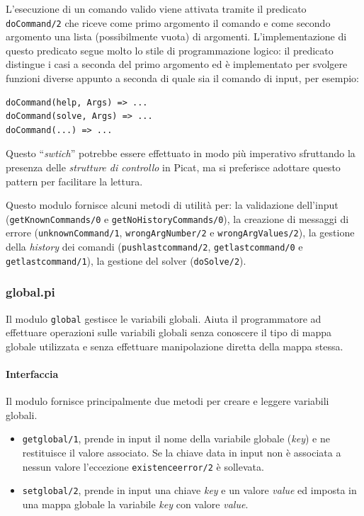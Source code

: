 \documentclass[12pt,a4paper,openright]{book} %
\begin{document}
L'esecuzione di un comando valido viene attivata tramite il predicato
\texttt{doCommand/2} che riceve come primo argomento il comando e come
secondo argomento una lista (possibilmente vuota) di
argomenti. L'implementazione di questo predicato segue molto lo stile
di programmazione logico: il predicato distingue i casi a seconda del
primo argomento ed è implementato per svolgere funzioni diverse
appunto a seconda di quale sia il comando di input, per esempio:
\begin{verbatim}
doCommand(help, Args) => ...
doCommand(solve, Args) => ...
doCommand(...) => ...
\end{verbatim}
Questo ``\textit{swtich}'' potrebbe essere effettuato in modo più
imperativo sfruttando la presenza delle \textit{strutture di
  controllo} in Picat, ma si preferisce adottare questo pattern per
facilitare la lettura.

Questo modulo fornisce alcuni metodi di utilità per: la validazione
dell'input (\texttt{getKnownCommands/0} e
\texttt{getNoHistoryCommands/0}), la creazione di messaggi di errore
(\texttt{unknownCommand/1}, \texttt{wrongArgNumber/2} e
\texttt{wrongArgValues/2}), la gestione della \textit{history} dei
comandi (\texttt{push\textunderscore last\textunderscore command/2},
\texttt{get\textunderscore last\textunderscore command/0} e
\texttt{get\textunderscore last\textunderscore command/1}), la
gestione del solver (\texttt{doSolve/2}).

\subsubsection{global.pi}

Il modulo \texttt{global} gestisce le variabili globali. Aiuta il
programmatore ad effettuare operazioni sulle variabili globali senza
conoscere il tipo di mappa globale utilizzata e senza effettuare
manipolazione diretta della mappa stessa.

\paragraph{Interfaccia}
Il modulo fornisce principalmente due metodi per creare e leggere
variabili globali.

\begin{itemize}
	\item \texttt{get\textunderscore global/1}, prende in input il
          nome della variabile globale (\emph{key}) e ne restituisce
          il valore associato. Se la chiave data in input non è
          associata a nessun valore l'eccezione
          \texttt{existence\textunderscore error/2} è sollevata.
	\item \texttt{set\textunderscore global/2}, prende in input
          una chiave \emph{key} e un valore \emph{value} ed imposta in
          una mappa globale la variabile \emph{key} con valore
          \emph{value}.
\end{itemize}
\end{document}
